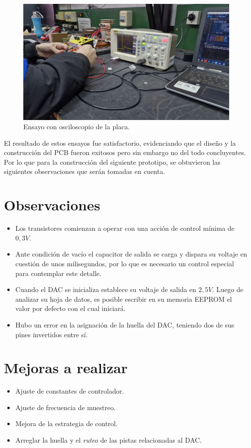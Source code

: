 \begin{figure}[H]
    \centering
    \includegraphics[width=\textwidth]{./imagenes/fotos/osciloscopio.jpg}
    \caption{Ensayo con osciloscopio de la placa.}
    \label{F:esayos_y_pruebas}
\end{figure}
El resultado de estos ensayos fue satisfactorio, evidenciando que el diseño y la construcción del PCB fueron exitosos pero sin embargo no del todo concluyentes. Por lo que para la construcción del siguiente prototipo, se obtuvieron las siguientes observaciones que serán tomadas en cuenta.  \par 
\section*{Observaciones}
\begin{itemize}
    \item Los transistores comienzan a operar con una acción de control mínima de $0,3V$.
    \item Ante condición de vacío el capacitor de salida se carga y dispara su voltaje en cuestión de unos milisegundos, por lo que es necesario un control especial para contemplar este detalle.
    \item Cuando el DAC se inicializa establece su voltaje de salida en $2,5V$. Luego de analizar su hoja de datos, es posible escribir en su memoria EEPROM el valor por defecto con el cual iniciará.
    \item Hubo un error en la asignación de la huella del DAC, teniendo dos de sus pines invertidos entre sí.
\end{itemize}

\section*{Mejoras a realizar}
\begin{itemize}
    \item Ajuste de constantes de controlador.
    \item Ajuste de frecuencia de muestreo.
    \item Mejora de la estrategia de control.
    \item Arreglar la huella y el \textit{ruteo} de las pistas relacionadas al DAC.
\end{itemize}


